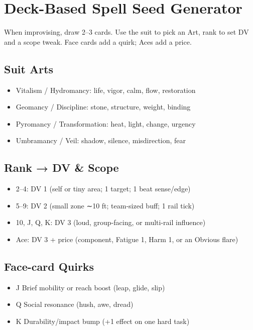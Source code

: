 \documentclass[11pt]{report}
\begin{document}
\section{Deck-Based Spell Seed Generator}

When improvising, draw 2–3 cards. Use the suit to pick an Art, rank to set DV and a scope tweak. Face cards add a quirk; Aces add a price.

\subsection{Suit Arts}
\begin{itemize}
    \item \heartsuit Vitalism / Hydromancy: life, vigor, calm, flow, restoration
    \item \clubsuit Geomancy / Discipline: stone, structure, weight, binding
    \item \diamondsuit Pyromancy / Transformation: heat, light, change, urgency
    \item \spadesuit Umbramancy / Veil: shadow, silence, misdirection, fear
\end{itemize}

\subsection{Rank → DV \& Scope}
\begin{itemize}
    \item 2–4: DV 1 (self or tiny area; 1 target; 1 beat sense/edge)
    \item 5–9: DV 2 (small zone ∼10 ft; team-sized buff; 1 rail tick)
    \item 10, J, Q, K: DV 3 (loud, group-facing, or multi-rail influence)
    \item Ace: DV 3 + price (component, Fatigue 1, Harm 1, or an Obvious flare)
\end{itemize}

\subsection{Face-card Quirks}
\begin{itemize}
    \item J Brief mobility or reach boost (leap, glide, slip)
    \item Q Social resonance (hush, awe, dread)
    \item K Durability/impact bump (+1 effect on one hard task)
\end{itemize}
\end{document}
